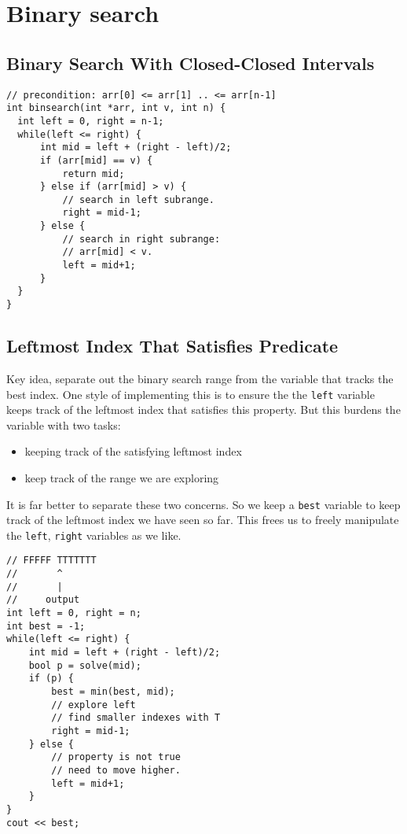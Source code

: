 \chapter{Binary search}

\section{Binary Search With Closed-Closed Intervals}

\begin{verbatim}
// precondition: arr[0] <= arr[1] .. <= arr[n-1]
int binsearch(int *arr, int v, int n) {
  int left = 0, right = n-1;
  while(left <= right) {
      int mid = left + (right - left)/2;
      if (arr[mid] == v) {
          return mid;
      } else if (arr[mid] > v) {
          // search in left subrange.
          right = mid-1; 
      } else {
          // search in right subrange:
          // arr[mid] < v.
          left = mid+1;
      }
  }
}
\end{verbatim}

\section{Leftmost Index That Satisfies Predicate}

Key idea, separate out the binary search range from the variable that tracks
the best index. One style of implementing this is to ensure the the \texttt{left}
variable keeps track of the leftmost index that satisfies this property. But this burdens
the variable with two tasks: 
\begin{itemize}
\item keeping track of the satisfying leftmost index
\item keep track of the range we are exploring
\end{itemize}

It is far better to separate these two concerns. So we keep a \texttt{best} variable
to keep track of the leftmost index we have seen so far. This frees us to freely manipulate
the \texttt{left}, \texttt{right} variables as we like.

\begin{verbatim}
// FFFFF TTTTTTT
//       ^
//       |
//     output
int left = 0, right = n;
int best = -1;
while(left <= right) {
    int mid = left + (right - left)/2;
    bool p = solve(mid);
    if (p) {
        best = min(best, mid);
        // explore left
        // find smaller indexes with T
        right = mid-1; 
    } else {
        // property is not true
        // need to move higher.
        left = mid+1;
    }
}
cout << best;
\end{verbatim}

